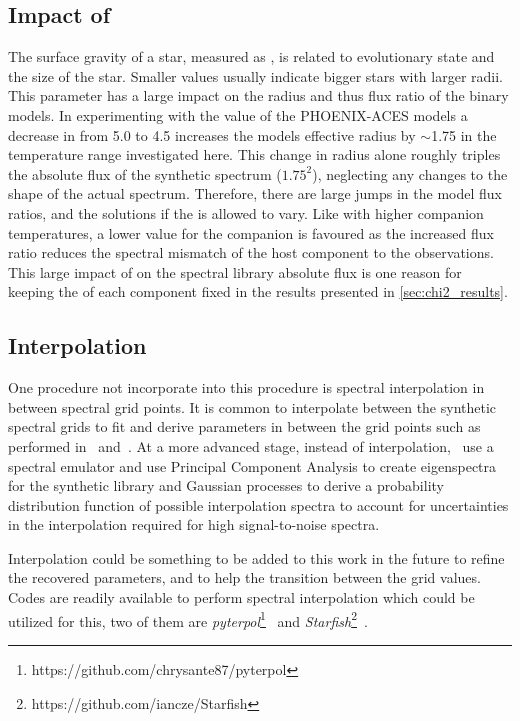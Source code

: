 \subsection{Impact of \Logg{}}
\label{subsec:logg} 
The surface gravity of a star, measured as \Logg{}, is related to evolutionary state and the size of the star.
Smaller \Logg{} values usually indicate bigger stars with larger radii.
This parameter has a large impact on the radius and thus flux ratio of the binary models.
In experimenting with the \Logg{} value of the {PHOENIX-ACES} models a decrease in \Logg{} from 5.0 to 4.5 increases the models effective radius by \(\sim\)1.75 in the temperature range investigated here.
This change in radius alone roughly triples the absolute flux of the synthetic spectrum (\(1.75^2\)), neglecting any changes to the shape of the actual spectrum.
Therefore, there are large jumps in the model flux ratios, and the \textchisquared{} solutions if the \Logg{} is allowed to vary.
Like with higher companion temperatures, a lower \Logg{} value for the companion is favoured as the increased flux ratio reduces the spectral mismatch of the host component to the observations.
This large impact of \Logg{} on the spectral library absolute flux is one reason for keeping the \Logg{} of each component fixed in the \textchisquared{} results presented in \cref{sec:chi2_results}.

\subsection{Interpolation}
\label{subsec:interpolation}
One procedure not incorporate into this \textchisquared{} procedure is spectral interpolation in between spectral grid points.
It is common to interpolate between the synthetic spectral grids to fit and derive parameters in between the grid points such as performed in~\citet{nemravova_xtauri_2016} and~\citet{passegger_fundamental_2016}.
At a more advanced stage, instead of interpolation,~\cite{czekala_constructing_2015} use a spectral emulator and use Principal Component Analysis to create eigenspectra for the synthetic library and Gaussian processes to derive a probability distribution function of possible interpolation spectra to account for uncertainties in the interpolation required for high signal-to-noise spectra.

Interpolation could be something to be added to this work in the future to refine the recovered parameters, and to help the transition between the grid \Logg{} values.
Codes are readily available to perform spectral interpolation which could be utilized for this, two of them are \emph{pyterpol}\footnote{https://github.com/chrysante87/pyterpol}~\citet{nemravova_xtauri_2016} and \emph{Starfish}\footnote{https://github.com/iancze/Starfish}~\cite{czekala_constructing_2015}.


